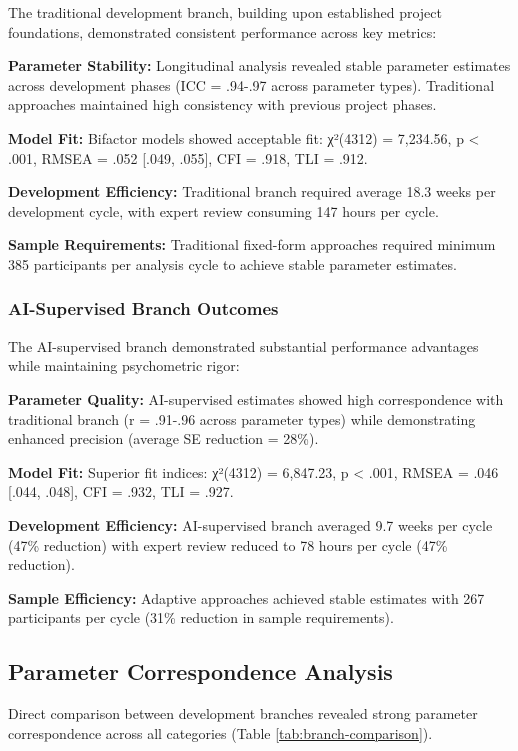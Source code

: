 \documentclass[12pt,a4paper]{article}
\begin{document}
The traditional development branch, building upon established project foundations, demonstrated consistent performance across key metrics:

\textbf{Parameter Stability:} Longitudinal analysis revealed stable parameter estimates across development phases (ICC = .94-.97 across parameter types). Traditional approaches maintained high consistency with previous project phases.

\textbf{Model Fit:} Bifactor models showed acceptable fit: χ²(4312) = 7,234.56, p < .001, RMSEA = .052 [.049, .055], CFI = .918, TLI = .912.

\textbf{Development Efficiency:} Traditional branch required average 18.3 weeks per development cycle, with expert review consuming 147 hours per cycle.

\textbf{Sample Requirements:} Traditional fixed-form approaches required minimum 385 participants per analysis cycle to achieve stable parameter estimates.

\subsubsection{AI-Supervised Branch Outcomes}

The AI-supervised branch demonstrated substantial performance advantages while maintaining psychometric rigor:

\textbf{Parameter Quality:} AI-supervised estimates showed high correspondence with traditional branch (r = .91-.96 across parameter types) while demonstrating enhanced precision (average SE reduction = 28\%).

\textbf{Model Fit:} Superior fit indices: χ²(4312) = 6,847.23, p < .001, RMSEA = .046 [.044, .048], CFI = .932, TLI = .927.

\textbf{Development Efficiency:} AI-supervised branch averaged 9.7 weeks per cycle (47\% reduction) with expert review reduced to 78 hours per cycle (47\% reduction).

\textbf{Sample Efficiency:} Adaptive approaches achieved stable estimates with 267 participants per cycle (31\% reduction in sample requirements).

\subsection{Parameter Correspondence Analysis}

Direct comparison between development branches revealed strong parameter correspondence across all categories (Table \ref{tab:branch-comparison}).
\end{document}
